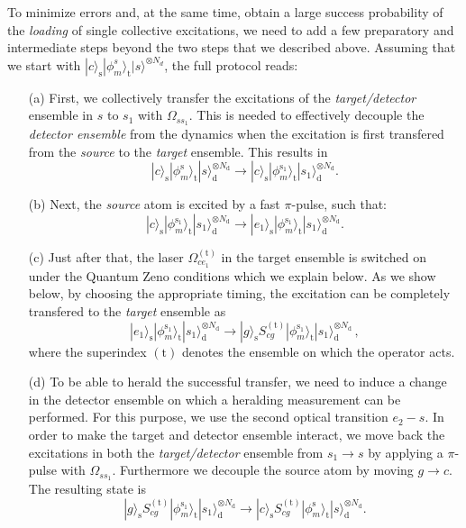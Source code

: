 \documentclass[twocolumn,pra,aps,superscriptaddress,showpacs]{revtex4-1}
\newcommand{\ket}[1]{|#1\rangle}
\newcommand{\trg}{\mathrm{(t)}}
\newcommand{\rs}{\mathrm{s}}
\newcommand{\rd}{\mathrm{d}}
\newcommand{\rt}{\mathrm{t}}
\begin{document}
To minimize errors and, at the same time, obtain a large success probability of the \emph{loading} of single collective excitations, we need to add a few preparatory and intermediate steps beyond the two steps that we described above. Assuming that we start with $\ket{c}_\rs\ket{\phi^s_m}_\rt\ket{s}^{\otimes N_d}$, the full protocol reads:
%
\begin{enumerate}
	\item [(a)]
	First, we collectively transfer the excitations of the \emph{target/detector} ensemble in $s$ to $s_1$ with $\Omega_{ss_1}$. This is needed to effectively decouple the \emph{detector ensemble} from the dynamics when the excitation is first transfered from the \emph{source} to the \emph{target} ensemble. This results in
	\begin{equation}
	\ket{c}_\rs  \ket{\phi_m^\rs}_\rt \ket{s}^{\otimes N_\rd}_\rd
	\rightarrow
	\ket{c}_\rs \ket{\phi_m^{\rs_1}}_\rt \ket{s_1}^{\otimes N_\rd}_\rd.
	\end{equation}
	
	\item [(b)] Next, the \emph{source} atom is excited by a fast $\pi$-pulse, such that:
	\begin{equation}
	\ket{c}_\rs \ket{\phi_m^{\rs_1}}_\rt \ket{s_1}^{\otimes N_\rd}_\rd
	\rightarrow
	\ket{e_1}_\rs \ket{\phi_m^{\rs_1}}_\rt \ket{s_1}^{\otimes N_\rd}_\rd.
	\end{equation}
	
	\item [(c)] Just after that, the laser $\Omega_{ce_1}^\trg$ in the target ensemble is switched on under the Quantum Zeno conditions which we explain below. As we show below, by choosing the appropriate timing, the excitation can be completely transfered to the \emph{target} ensemble as
	\begin{equation}
	\ket{e_1}_\rs \ket{\phi_m^{\rs_1}}_\rt \ket{s_1}^{\otimes N_\rd}_\rd
	\rightarrow
	\ket{g}_\rs S_{cg}^{(\rt)}\ket{\phi_m^{\rs_1}}_\rt \ket{s_1}^{\otimes N_\rd}_\rd\,,
	\end{equation}
	where the superindex $\trg$ denotes the ensemble on which the operator acts.
	
	\item [(d)] To be able to herald the successful transfer, we need to induce a change in the detector ensemble on which a heralding measurement can be performed. For this purpose, we use the second optical transition $e_2-s$. In order to make the target and detector ensemble interact, we move back the excitations in both the \emph{target/detector} ensemble from $s_1\rightarrow s$ by applying a $\pi$-pulse with $\Omega_{s s_1}$. Furthermore we decouple the source atom by moving $g \rightarrow c$. The resulting state is
	\begin{equation}
	\ket{g}_\rs S_{cg}^{(\rt)}\ket{\phi_m^{\rs_1}}_\rt \ket{s_1}^{\otimes N_\rd}_\rd
	\rightarrow
	\ket{c}_\rs S_{cg}^{(\rt)}\ket{\phi_m^{\rs}}_\rt \ket{s}^{\otimes N_\rd}_\rd.
	\end{equation}
	

\end{enumerate}
\end{document}
